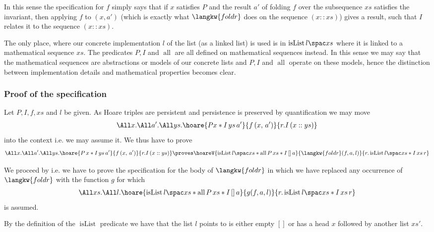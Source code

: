 In this sense the specification for $f$ simply says that if $x$ satisfies $P$ and the result $a'$ of folding $f$ over the subsequence $xs$ satisfies the invariant, then applying $f$ to $(x, a')$ (which is exactly what $\langkw{foldr}$ does on the sequence $(x::xs)$) gives a result, such that $I$ relates it to the sequence $(x::xs)$.

\begin{remark}
  The only place, where our concrete implementation $l$ of the list (as a linked list) is used is in $\isList {l} {xs}$ where it is linked to a mathematical sequence $xs$.
  The predicates $P, I$ and $\operatorname{all}$ are all defined on mathematical sequences instead.
  In this sense we may say that the mathematical sequences are abstractions or models of our concrete lists and $P, I$ and $\operatorname{all}$ operate on these models, hence the distinction between implementation details and mathematical properties becomes clear.
\end{remark}

\subsubsection*{Proof of the specification}
Let $P, I, f, xs$ and $l$ be given. As Hoare triples are persistent and persistence is preserved by quantification we may move 
\begin{align*}
\All x. \All a'. \All ys. \hoare{P x \ast I \, ys \, a'}{f \, (x, \, a')}{r. I\, (x::ys)}
 \end{align*} 
 into the context i.e. we may assume it. We thus have to prove
\begin{align*}
\All x. \All a'. \All ys. \hoare{P \, x \ast I \, ys \, a'}{f \, (x, \, a')}{r. I\, (x::ys)}
\proves \hoareV
{ \isList {l} {xs} \ast \operatorname{all} P \, xs \ast  I \, [] \, a}
{\langkw{foldr}(f, a, l)}
{r.  \isList {l} {xs} \ast I \, xs\, r}
\end{align*}

We proceed by  i.e. we have to prove the specification for the body of $\langkw{foldr}$ in which we have replaced any occurrence of $\langkw{foldr}$ with the function $g$ for which
\begin{align*}
\All xs. \All l. \hoare{ \isList {l} {xs} \ast \operatorname{all} P \, xs \ast  I \, [] \, a}
 {g(f, a, l)}
{r.  \isList {l} {xs} \ast I \, xs\, r}
\end{align*}
is assumed.

By the definition of the $\operatorname{isList}$ predicate we have that the list $l$ points to is either empty $[]$ or has a head $x$ followed by another list $xs'$.  

